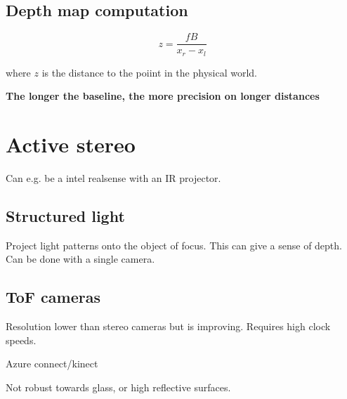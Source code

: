 \documentclass[a4paper]{article}
\begin{document}
\subsection{Depth map computation}

\begin{equation}
z = \frac{f B}{x_r - x_l} 
\end{equation}

where $ z $ is the distance to the poiint in the physical world.


\textbf{The longer the baseline, the more precision on longer distances} 


\section{Active stereo}
Can e.g. be a intel realsense with an IR projector.


\subsection{Structured light}
Project light patterns onto the object of focus. This can give a sense of depth. Can be done with a single camera.


\subsection{ToF cameras}
Resolution lower than stereo cameras but is improving.
Requires high clock speeds.

Azure connect/kinect


Not robust towards glass, or high reflective surfaces.
\end{document}
